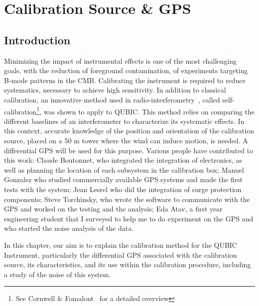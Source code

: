 \documentclass[../../thesis.tex]{subfiles}
\begin{document}
\chapter{Calibration Source \& GPS}
\minitoc

\section{Introduction}

Minimizing the impact of instrumental effects is one of the most challenging goals, with the reduction of foreground contamination, of experiments targeting B-mode patterns in the CMB. Calibrating the instrument is required to reduce systematics, necessary to achieve high sensitivity. In addition to classical calibration, an innovative method used in radio-interferometry~\cite{paper_selfcal_1,paper_selfcal_2}, called self-calibration\footnote{See Cornwell \& Fomalont~\cite{selfcal_overview} for a detailed overview}, was shown to apply to QUBIC. This method relies on comparing the different baselines of an interferometer to characterize its systematic effects. In this context, accurate knowledge of the position and orientation of the calibration source, placed on a 50 m tower where the wind can induce motion, is needed. A differential GPS will be used for this purpose. Various people have contributed to this work: Claude Boutonnet, who integrated the integration of electronics, as well as planning the location of each subsystem in the calibration box; Manuel Gonzalez who studied commercially available GPS systems and made the first tests with the system; Jean Lesrel who did the integration of surge protection components; Steve Torchinsky, who wrote the software to communicate with the GPS and worked on the testing and the analysis; Eda Atav, a first year engineering student that I surveyed to help me to do experiment on the GPS and who started the noise analysis of the data.

In this chapter, our aim is to explain the calibration method for the QUBIC Instrument, particularly the differential GPS associated with the calibration source, its characteristics, and its use within the calibration procedure, including a study of the noise of this system. 

\end{document}
